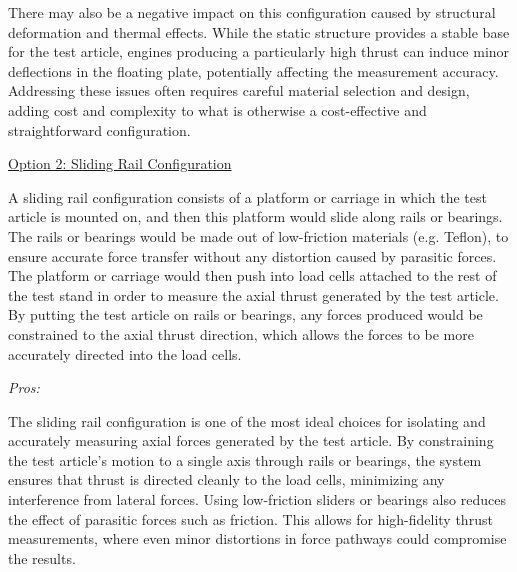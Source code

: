 There may also be a negative impact on this configuration caused by structural deformation and thermal effects. While the static structure provides a stable base for the test article, engines producing a particularly high thrust can induce minor deflections in the floating plate, potentially affecting the measurement accuracy. Addressing these issues often requires careful material selection and design, adding cost and complexity to what is otherwise a cost-effective and straightforward configuration.

\noindent\underline{Option 2: Sliding Rail Configuration}

A sliding rail configuration consists of a platform or carriage in which the test article is mounted on, and then this platform would slide along rails or bearings. The rails or bearings would be made out of low-friction materials (e.g. Teflon), to ensure accurate force transfer without any distortion caused by parasitic forces. The platform or carriage would then push into load cells attached to the rest of the test stand in order to measure the axial thrust generated by the test article. By putting the test article on rails or bearings, any forces produced would be constrained to the axial thrust direction, which allows the forces to be more accurately directed into the load cells.

\begin{figure}
    \centering
    \hspace{3em}
    \caption{}
    \label{fig:sliding-rail-example}
\end{figure}

\noindent\textit{Pros:}

The sliding rail configuration is one of the most ideal choices for isolating and accurately measuring axial forces generated by the test article. By constraining the test article’s motion to a single axis through rails or bearings, the system ensures that thrust is directed cleanly to the load cells, minimizing any interference from lateral forces. Using low-friction sliders or bearings also reduces the effect of parasitic forces such as friction. This allows for high-fidelity thrust measurements, where even minor distortions in force pathways could compromise the results.

